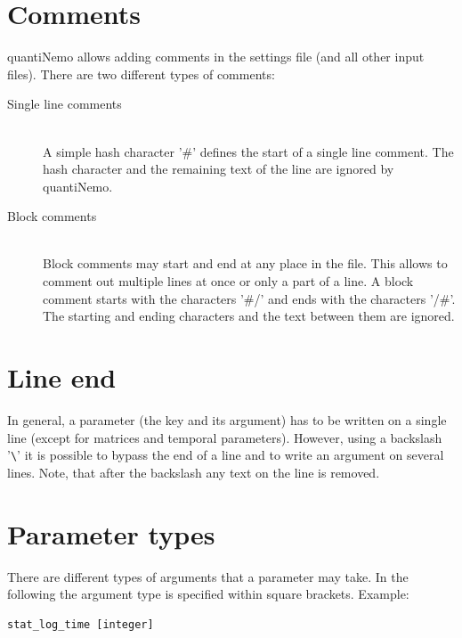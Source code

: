 \documentclass[letterpaper,12pt,oneside]{book}
\begin{document}
\section{Comments}
quantiNemo allows adding comments in the settings file (and all other input files). There are two different types of comments:
\begin{description}
\item[Single line comments]\hspace*{\fill} \index{\#}\\
A simple hash character '\#' defines the start of a single line comment. The hash character and the remaining text of the line are ignored by quantiNemo.

\item[Block comments]\hspace*{\fill} \\
Block comments may start and end at any place in the file. This allows to comment out multiple lines at once or only a part of a line. A block comment starts with the characters '\#/' and ends with the characters '/\#'. The starting and ending characters and the text between them are ignored.
\end{description}

\section{Line end}
In general, a parameter (the key and its argument) has to be written on a single line (except for matrices and temporal parameters). However, using a backslash '\verb"\"' it is possible to bypass the end of a line and to write an argument on several lines. Note, that after the backslash any text on the line is removed. \index{\textbackslash}


\section{Parameter types}
There are different types of arguments that a parameter may take. In the following the argument type is specified within square brackets. Example:
\begin{lstlisting}[frame=single]
stat_log_time [integer]
\end{lstlisting}
\end{document}
